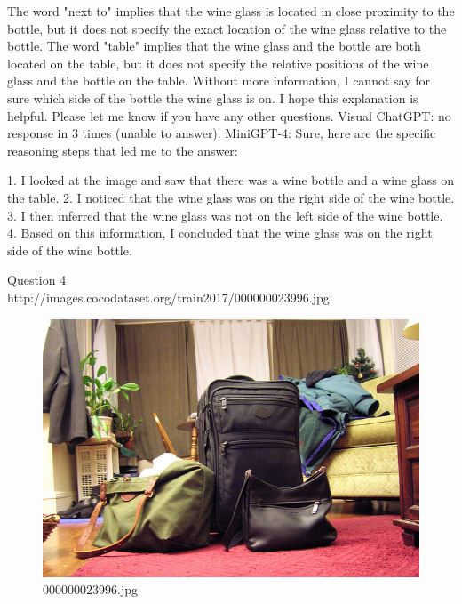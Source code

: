 \begin{enumerate}
        The word "next to" implies that the wine glass is located in close proximity to the bottle, but it does not specify the exact location of the wine glass relative to the bottle.
        The word "table" implies that the wine glass and the bottle are both located on the table, but it does not specify the relative positions of the wine glass and the bottle on the table.
        Without more information, I cannot say for sure which side of the bottle the wine glass is on.
        I hope this explanation is helpful. Please let me know if you have any other questions.
        \subitem Visual ChatGPT: no response in 3 times (unable to answer).
        \subitem MiniGPT-4: Sure, here are the specific reasoning steps that led me to the answer:

        1. I looked at the image and saw that there was a wine bottle and a wine glass on the table.
        2. I noticed that the wine glass was on the right side of the wine bottle.
        3. I then inferred that the wine glass was not on the left side of the wine bottle.
        4. Based on this information, I concluded that the wine glass was on the right side of the wine bottle.
    \end{enumerate}
Question 4\\
http://images.cocodataset.org/train2017/000000023996.jpg
    \begin{figure}[h]
        \centering
        \includegraphics[width=0.8\linewidth]{../image set/easy/000000023996.jpg}
        \caption{000000023996.jpg}
    \end{figure}
